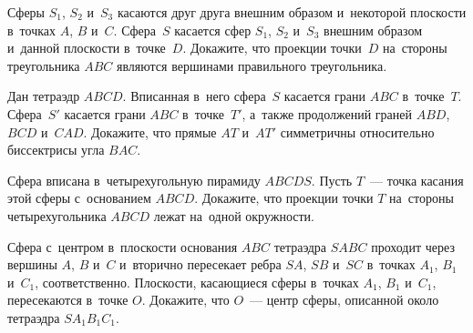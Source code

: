 \begin{problems}
\item
Сферы $S_1$, $S_2$ и~$S_3$ касаются друг друга внешним образом и~некоторой
плоскости в~точках $A$, $B$ и~$C$.
Сфера~$S$ касается сфер $S_1$, $S_2$ и~$S_3$ внешним образом и~данной плоскости
в~точке~$D$.
Докажите, что проекции точки~$D$ на~стороны треугольника $ABC$ являются
вершинами правильного треугольника.

\item
Дан тетраэдр $ABCD$.
Вписанная в~него сфера~$S$ касается грани $ABC$ в~точке~$T$.
Сфера~$S'$ касается грани $ABC$ в~точке~$T'$, а~также продолжений граней
$ABD$, $BCD$ и~$CAD$.
Докажите, что прямые $AT$ и~$AT'$ симметричны относительно биссектрисы
угла $BAC$.

\item
Сфера вписана в~четырехугольную пирамиду $ABCDS$.
Пусть $T$~--- точка касания этой сферы с~основанием $ABCD$.
Докажите, что проекции точки $T$ на~стороны четырехугольника $ABCD$ лежат
на~одной окружности.

\item
Сфера с~центром в~плоскости основания $ABC$ тетраэдра $SABC$ проходит через
вершины $A$, $B$ и~$C$ и~вторично
пересекает ребра $SA$, $SB$ и~$SC$ в~точках $A_1$, $B_1$ и~$C_1$,
соответственно.
Плоскости, касающиеся сферы в~точках
$A_1$, $B_1$ и~$C_1$, пересекаются в~точке $O$.
Докажите, что $O$~--- центр сферы, описанной около тетраэдра $SA_1B_1C_1$.


\end{problems}

